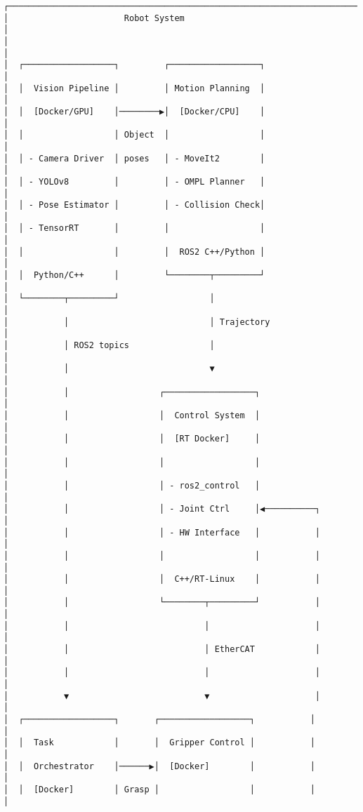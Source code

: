 \documentclass[
]{article}
\begin{document}
\begin{verbatim}
┌────────────────────────────────────────────────────────────────────────┐
│                       Robot System                                     │
│                                                                        │
│  ┌──────────────────┐         ┌──────────────────┐                    │
│  │  Vision Pipeline │         │ Motion Planning  │                    │
│  │  [Docker/GPU]    │────────▶│  [Docker/CPU]    │                    │
│  │                  │ Object  │                  │                    │
│  │ - Camera Driver  │ poses   │ - MoveIt2        │                    │
│  │ - YOLOv8         │         │ - OMPL Planner   │                    │
│  │ - Pose Estimator │         │ - Collision Check│                    │
│  │ - TensorRT       │         │                  │                    │
│  │                  │         │  ROS2 C++/Python │                    │
│  │  Python/C++      │         └────────┬─────────┘                    │
│  └────────┬─────────┘                  │                              │
│           │                            │ Trajectory                   │
│           │ ROS2 topics                │                              │
│           │                            ▼                              │
│           │                  ┌──────────────────┐                     │
│           │                  │  Control System  │                     │
│           │                  │  [RT Docker]     │                     │
│           │                  │                  │                     │
│           │                  │ - ros2_control   │                     │
│           │                  │ - Joint Ctrl     │◀──────────┐         │
│           │                  │ - HW Interface   │           │         │
│           │                  │                  │           │         │
│           │                  │  C++/RT-Linux    │           │         │
│           │                  └────────┬─────────┘           │         │
│           │                           │                     │         │
│           │                           │ EtherCAT            │         │
│           │                           │                     │         │
│           ▼                           ▼                     │         │
│  ┌──────────────────┐       ┌──────────────────┐           │         │
│  │  Task            │       │  Gripper Control │           │         │
│  │  Orchestrator    │──────▶│  [Docker]        │           │         │
│  │  [Docker]        │ Grasp │                  │           │         │

\end{verbatim}
\end{document}
